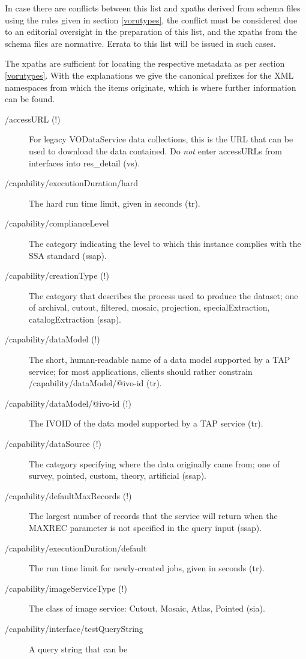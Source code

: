 \documentclass[11pt,a4paper]{ivoa}
\begin{document}
In case there are conflicts between this list and xpaths derived 
from schema files using the rules given in section \ref{vorutypes}, the conflict must be considered due to an
editorial oversight in the preparation of this list, and the xpaths from the
schema files are normative.  Errata to this list will be issued in such
cases.

The xpaths are sufficient for locating the respective metadata as per
section \ref{vorutypes}.  With the explanations we
give the canonical prefixes for the XML namespaces from which the items
originate, which is where further information can be found.


\begin{description}
\item[/accessURL (!)]For legacy VODataService data collections, this is
the URL that can be used to download the data contained.  Do
\emph{not} enter accessURLs from interfaces into res\_detail (vs).
\item[/capability/executionDuration/hard]The hard run time limit, given in seconds (tr).
\item[/capability/complianceLevel]The category indicating the level to which this instance complies with the SSA standard (ssap).
\item[/capability/creationType (!)]The category that describes the process used to produce the dataset; one of archival, cutout, filtered, mosaic, projection, specialExtraction, catalogExtraction (ssap).
\item[/capability/dataModel (!)]The short, human-readable name of a data model supported by a TAP service; for most applications, clients should rather constrain /capability/dataModel/@ivo-id (tr).  
\item[/capability/dataModel/@ivo-id (!)]The IVOID of the data model supported by a TAP service (tr).
\item[/capability/dataSource (!)]The category specifying where the data originally came from; one of survey, pointed, custom, theory, artificial (ssap).
\item[/capability/defaultMaxRecords (!)]The largest number of records that the service will return when the MAXREC parameter is not specified in the query input (ssap).
\item[/capability/executionDuration/default]The run time limit for newly-created jobs, given in seconds (tr).
\item[/capability/imageServiceType (!)]The class of image service: Cutout, Mosaic, Atlas, Pointed (sia).
\item[/capability/interface/testQueryString] A query string that can be

\end{description}
\end{document}
